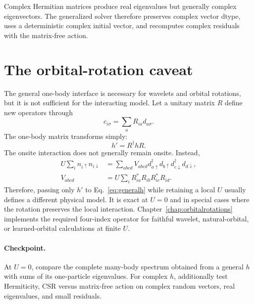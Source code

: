 Complex Hermitian matrices produce real eigenvalues but generally complex
eigenvectors.  The generalized solver therefore preserves complex vector
dtype, uses a deterministic complex initial vector, and recomputes complex
residuals with the matrix-free action.

\section{The orbital-rotation caveat}

The general one-body interface is necessary for wavelets and orbital rotations,
but it is not sufficient for the interacting model.  Let a unitary matrix $R$
define new operators through
\begin{equation}
c_{i\sigma}=\sum_a R_{ia}d_{a\sigma}.
\end{equation}
The one-body matrix transforms simply:
\begin{equation}
h' = R^\dagger h R.
\end{equation}
The onsite interaction does not generally remain onsite.  Instead,
\begin{align}
U\sum_i n_{i\uparrow}n_{i\downarrow}
&=\sum_{abcd}V_{abcd}
d_{a\uparrow}^\dagger d_{b\uparrow}
d_{c\downarrow}^\dagger d_{d\downarrow},\\
V_{abcd}
&=U\sum_i R^*_{ia}R_{ib}R^*_{ic}R_{id}.
\label{eq:rotatedinteraction}
\end{align}
Therefore, passing only $h'$ to Eq.~\eqref{eq:generalh} while retaining a local
$U$ usually defines a different physical model.  It is exact at $U=0$ and in
special cases where the rotation preserves the local interaction.
Chapter~\ref{chap:orbitalrotations} implements the required four-index
operator for faithful wavelet, natural-orbital, or learned-orbital
calculations at finite $U$.

\paragraph{Checkpoint.}
At $U=0$, compare the complete many-body spectrum obtained from a general $h$
with sums of its one-particle eigenvalues.  For complex $h$, additionally test
Hermiticity, CSR versus matrix-free action on complex random vectors, real
eigenvalues, and small residuals.
